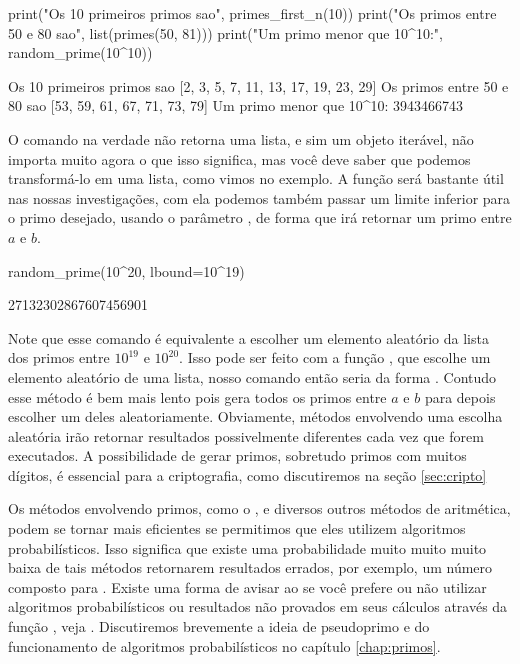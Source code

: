 \begin{sageinput}
print("Os 10 primeiros primos sao", primes_first_n(10))
print("Os primos entre 50 e 80 sao", list(primes(50, 81)))
print("Um primo menor que 10^10:", random_prime(10^10))
\end{sageinput}
\begin{sageoutput}
Os 10 primeiros primos sao [2, 3, 5, 7, 11, 13, 17, 19, 23, 29]
Os primos entre 50 e 80 sao [53, 59, 61, 67, 71, 73, 79]
Um primo menor que 10^10: 3943466743
\end{sageoutput}

O comando  na verdade não retorna uma lista, 
e sim um objeto iterável, não importa muito agora o que isso
significa, mas você deve saber que podemos transformá-lo
em uma lista, 
como vimos no exemplo. A função  será
bastante útil nas nossas investigações, com ela podemos
também passar um limite inferior para o primo desejado,
usando o parâmetro , de forma que
 irá retornar um 
primo entre $a$ e $b$.

\begin{sageinput}
random_prime(10^20, lbound=10^19)
\end{sageinput}
\begin{sageoutput}
27132302867607456901
\end{sageoutput}

Note que esse comando é equivalente a escolher
um elemento aleatório da lista dos primos entre
$10^{19}$ e $10^{20}$. Isso pode ser feito com
a função , que escolhe 
um elemento aleatório de uma lista,
nosso comando então seria
da forma {}. 
Contudo esse método é bem mais lento pois 
gera todos os primos entre $a$ e $b$ para depois escolher
um deles aleatoriamente.
Obviamente, métodos envolvendo uma escolha aleatória irão
retornar resultados possivelmente diferentes cada vez
que forem executados. A possibilidade de gerar
primos, sobretudo primos com muitos dígitos, é essencial
para a criptografia, como discutiremos na seção \ref{sec:cripto}

Os métodos envolvendo primos, como o ,
e diversos outros métodos de aritmética, podem se tornar 
mais eficientes se permitimos que eles utilizem 
algoritmos probabilísticos. Isso significa que existe uma
probabilidade muito muito muito baixa de tais métodos
retornarem resultados errados, por exemplo, um número composto
para  .
Existe uma forma de avisar ao \Sage
se você prefere ou não utilizar algoritmos probabilísticos ou
resultados não provados em seus cálculos através da
função , veja
\cite[Global proof preferences]{sagedoc}. Discutiremos
brevemente a ideia de pseudoprimo e do funcionamento 
de algoritmos probabilísticos no capítulo \ref{chap:primos}.


